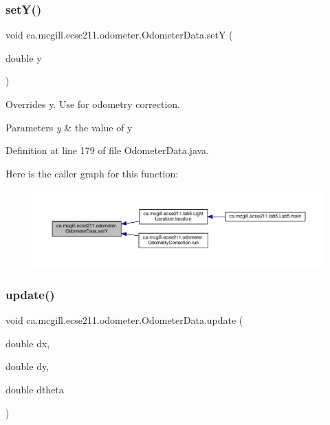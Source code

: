 \subsubsection{\texorpdfstring{set\+Y()}{setY()}}
{\footnotesize\ttfamily void ca.\+mcgill.\+ecse211.\+odometer.\+Odometer\+Data.\+setY (\begin{DoxyParamCaption}\item[{double}]{y }\end{DoxyParamCaption})}

Overrides y. Use for odometry correction.


\begin{DoxyParams}{Parameters}
{\em y} & the value of y \\
\hline
\end{DoxyParams}


Definition at line 179 of file Odometer\+Data.\+java.

Here is the caller graph for this function\+:
\nopagebreak
\begin{figure}[H]
\begin{center}
\leavevmode
\includegraphics[width=350pt]{classca_1_1mcgill_1_1ecse211_1_1odometer_1_1_odometer_data_a82986438cd462e66520bc62bb4bd2b75_icgraph}
\end{center}
\end{figure}
\mbox{\label{classca_1_1mcgill_1_1ecse211_1_1odometer_1_1_odometer_data_aaa06f190d634299fcb1b97a1891dad85}} 
\subsubsection{\texorpdfstring{update()}{update()}}
{\footnotesize\ttfamily void ca.\+mcgill.\+ecse211.\+odometer.\+Odometer\+Data.\+update (\begin{DoxyParamCaption}\item[{double}]{dx,  }\item[{double}]{dy,  }\item[{double}]{dtheta }\end{DoxyParamCaption})}

